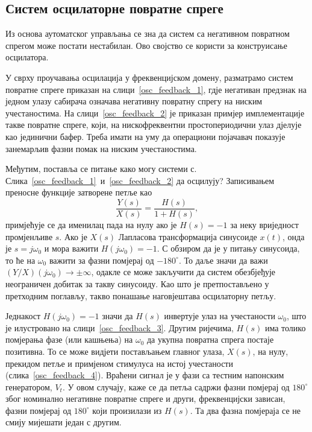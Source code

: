 \documentclass[master]{finthesis}
\begin{document}
\subsection{Систем осцилаторне повратне спреге}
Из основа аутоматског управљања се зна да систем са негативном повратном спрегом може постати нестабилан. Ово својство се користи за конструисање осцилатора. \par
У сврху проучавања осцилација у фреквенцијском домену, разматрамо систем повратне спреге приказан на слици~\ref{osc_feedback_1}, гдје негативан предзнак на једном улазу сабирача означава негативну повратну спрегу на ниским учестаностима. На слици~\ref{osc_feedback_2} је приказан примјер имплементације такве повратне спреге, који, на нискофреквентни простопериодични улаз дјелује као јединични бафер. Треба имати на уму да операциони појачавач показује занемарљив фазни помак на ниским учестаностима. \par


Међутим, поставља се питање како могу системи с. Слика~\ref{osc_feedback_1}~и~\ref{osc_feedback_2} да осцилују? Записивањем преносне функције затворене петље као 
\begin{equation} 
	\label{transfer_function}
	\frac{Y(s)}{X(s)}=\frac{H(s)}{1+H(s)},
\end{equation}
примјећује се да именилац пада на нулу ако је $H(s)=-1$ за неку вриједност промјенљиве $s$. Ако је $X(s)$ Лапласова трансформација синусоиде $x(t)$, онда је $s=j\omega_{0}$ и мора важити $H(j\omega_{0})=-1$. С обзиром да је у питању синусоида, то ће на $\omega_{0}$ важити за фазни помјерај од $-180^{\circ}$. То даље значи да важи $(Y/X)(j\omega_{0}) \rightarrow \pm\infty$, одакле се може закључити да систем обезбјеђује неограничен добитак за такву синусоиду. Као што је претпостављено у претходним поглављу, такво понашање наговјештава осцилаторну петљу. \par
Једнакост $H(j\omega_{0})=-1$ значи да $H(s)$ инвертује улаз на учестаности $\omega_{0}$, што је илустровано на слици~\ref{osc_feedback_3}. Другим ријечима, $H(s)$ има толико помјерања фазе (или кашњења) на $\omega_{0}$ да укупна повратна спрега постаје позитивна. То се може видјети постављањем главног улаза, $X(s)$, на нулу, прекидом петље и примјеном стимулуса на истој учестаности (слика~\ref{osc_feedback_4}). Враћени сигнал је у фази са тестним напонским генератором, $V_{t}$. У овом случају, каже се да петља садржи фазни помјерај од $180^{\circ}$ због номинално негативне повратне спреге и други, фреквенцијски зависан, фазни помјерај од $180^{\circ}$ који произилази из $H(s)$. Та два фазна помјераја се не смију мијешати један с другим. \par
\end{document}
